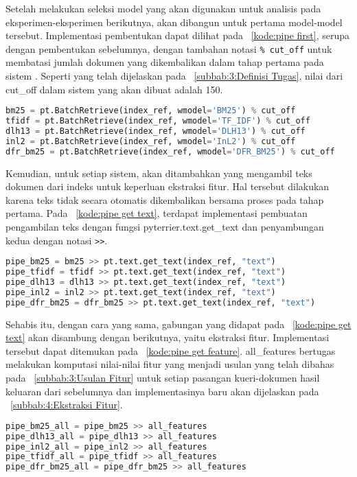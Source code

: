 Setelah melakukan seleksi model yang akan digunakan untuk analisis pada eksperimen-eksperimen berikutnya, akan dibangun \pipeline{} untuk \ranking{} pertama model-model tersebut. Implementasi pembentukan \pipeline{} dapat dilihat pada \kode{}~\ref{kode:pipe first}, serupa dengan pembentukan sebelumnya, dengan tambahan notasi \lstinline{% cut_off} untuk membatasi jumlah dokumen yang dikembalikan dalam tahap \ranking{} pertama pada sistem \cascaded{} \ir{}. Seperti yang telah dijelaskan pada \subbab{}~\ref{subbab:3:Definisi Tugas}, nilai dari cut\_off dalam sistem yang akan dibuat adalah 150.
\begin{lstlisting}[language=Python, caption={\Pipeline{} tahap \ranking{} pertama}, label={kode:pipe first}]
bm25 = pt.BatchRetrieve(index_ref, wmodel='BM25') % cut_off
tfidf = pt.BatchRetrieve(index_ref, wmodel='TF_IDF') % cut_off
dlh13 = pt.BatchRetrieve(index_ref, wmodel='DLH13') % cut_off
inl2 = pt.BatchRetrieve(index_ref, wmodel='InL2') % cut_off
dfr_bm25 = pt.BatchRetrieve(index_ref, wmodel='DFR_BM25') % cut_off
\end{lstlisting}

Kemudian, untuk setiap sistem, akan ditambahkan \pipeline{} yang mengambil teks dokumen dari indeks untuk keperluan ekstraksi fitur. Hal tersebut dilakukan karena teks tidak secara otomatis dikembalikan bersama proses \retrieval{} pada \ranking{} tahap pertama. Pada \kode{}~\ref{kode:pipe get text}, terdapat implementasi pembuatan \pipeline{} pengambilan teks dengan fungsi pyterrier.text.get\_text dan penyambungan kedua \pipeline{} dengan notasi \lstinline{>>}.
\begin{lstlisting}[language=Python, caption={Pengambilan teks dokumen pada \pipeline{}}, label={kode:pipe get text}]
pipe_bm25 = bm25 >> pt.text.get_text(index_ref, "text")
pipe_tfidf = tfidf >> pt.text.get_text(index_ref, "text")
pipe_dlh13 = dlh13 >> pt.text.get_text(index_ref, "text")
pipe_inl2 = inl2 >> pt.text.get_text(index_ref, "text")
pipe_dfr_bm25 = dfr_bm25 >> pt.text.get_text(index_ref, "text")
\end{lstlisting}

Sehabis itu, dengan cara yang sama, \pipeline{} gabungan yang didapat pada \kode{}~\ref{kode:pipe get text} akan disambung dengan \pipeline{} berikutnya, yaitu \pipeline{} ekstraksi fitur. Implementasi tersebut dapat ditemukan pada \kode{}~\ref{kode:pipe get feature}. \Pipeline{} all\_features bertugas melakukan komputasi nilai-nilai fitur yang menjadi usulan yang telah dibahas pada \subbab{}~\ref{subbab:3:Usulan Fitur} untuk setiap pasangan kueri-dokumen hasil keluaran dari \pipeline{} sebelumnya dan implementasinya baru akan dijelaskan pada \subbab{}~\ref{subbab:4:Ekstraksi Fitur}.
\begin{lstlisting}[language=Python, caption={\Pipeline{} ekstraksi fitur}, label={kode:pipe get feature}]
pipe_bm25_all = pipe_bm25 >> all_features
pipe_dlh13_all = pipe_dlh13 >> all_features
pipe_inl2_all = pipe_inl2 >> all_features
pipe_tfidf_all = pipe_tfidf >> all_features
pipe_dfr_bm25_all = pipe_dfr_bm25 >> all_features
\end{lstlisting}

